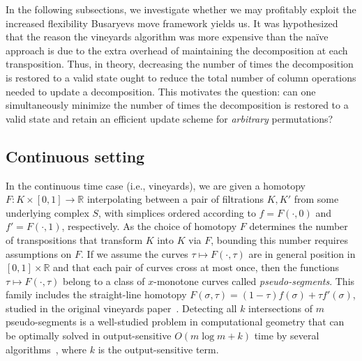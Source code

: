 \documentclass[sn-mathphys]{sn-jnl}
\begin{document}
In the following subsections, we investigate whether we may profitably exploit the increased flexibility Busaryevs move framework yields us.
It was hypothesized that the reason the vineyards algorithm was more expensive than the naïve approach is due to the extra overhead of maintaining the decomposition at each transposition.
Thus, in theory, decreasing the number of times the decomposition is restored to a valid state ought to reduce the total number of column operations needed to update a decomposition. This motivates the question: can one simultaneously minimize the number of times the decomposition is restored to a valid state and retain an efficient update scheme for \emph{arbitrary} permutations? 

\subsection{Continuous setting}\label{sec:continuous_setting}
In the continuous time case (i.e., vineyards), we are given a homotopy $F : K \times [0,1] \to \mathbb{R}$ interpolating between  a pair of filtrations $K, K'$ from some underlying complex $S$, with simplices ordered according to $f = F(\cdot, 0)$ and $f' = F(\cdot, 1)$, respectively. 
As the choice of homotopy $F$ determines the number of transpositions that transform $K$ into $K$ via $F$, bounding this number requires assumptions on $F$. 
If we assume the curves $\tau \mapsto F(\cdot, \tau)$ are in general position in $[0,1]\times \mathbb{R}$ and that each pair of curves cross  at most once, then the  functions $\tau\mapsto F(\cdot, \tau)$ belong to a class of $x$-monotone curves called \emph{pseudo-segments}.
This family includes the straight-line homotopy $F(\sigma, \tau) = (1 - \tau) f(\sigma) + \tau f'(\sigma)$,  studied in the original vineyards paper~\cite{cohen2006vines}. 
Detecting all $k$ intersections of $m$ pseudo-segments is a well-studied problem in computational geometry that can be optimally solved in output-sensitive $O(m \log m + k)$ time by several algorithms~\cite{boissonnat2000efficient}, where $k$ is the output-sensitive term. 
\end{document}
